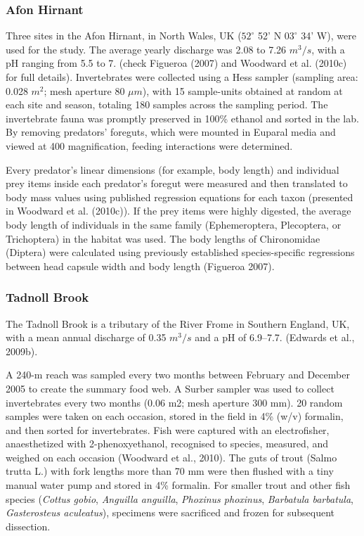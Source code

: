 \documentclass{article}
\begin{document}
\hypertarget{afon-hirnant}{%
\subsubsection{Afon Hirnant}\label{afon-hirnant}}

Three sites in the Afon Hirnant, in North Wales, UK (\(52^\circ\) 52' N
\(03^\circ\) 34' W), were used for the study. The average yearly
discharge was 2.08 to 7.26 \(m^3/s\), with a pH ranging from 5.5 to 7.
(check Figueroa (2007) and Woodward et al. (2010c) for full details).
Invertebrates were collected using a Hess sampler (sampling area: 0.028
\(m^2\); mesh aperture 80 \(\mu m\)), with 15 sample-units obtained at
random at each site and season, totaling 180 samples across the sampling
period. The invertebrate fauna was promptly preserved in 100\% ethanol
and sorted in the lab. By removing predators' foreguts, which were
mounted in Euparal media and viewed at 400 magnification, feeding
interactions were determined.

Every predator's linear dimensions (for example, body length) and
individual prey items inside each predator's foregut were measured and
then translated to body mass values using published regression equations
for each taxon (presented in Woodward et al. (2010c)). If the prey items
were highly digested, the average body length of individuals in the same
family (Ephemeroptera, Plecoptera, or Trichoptera) in the habitat was
used. The body lengths of Chironomidae (Diptera) were calculated using
previously established species-specific regressions between head capsule
width and body length (Figueroa 2007).

\hypertarget{tadnoll-brook}{%
\subsubsection{Tadnoll Brook}\label{tadnoll-brook}}

The Tadnoll Brook is a tributary of the River Frome in Southern England,
UK, with a mean annual discharge of 0.35 \(m^3/s\) and a pH of 6.9--7.7.
(Edwards et al., 2009b).

A 240-m reach was sampled every two months between February and December
2005 to create the summary food web. A Surber sampler was used to
collect invertebrates every two months (0.06 m2; mesh aperture 300 mm).
20 random samples were taken on each occasion, stored in the field in
4\% (w/v) formalin, and then sorted for invertebrates. Fish were
captured with an electrofisher, anaesthetized with 2-phenoxyethanol,
recognised to species, measured, and weighed on each occasion (Woodward
et al., 2010). The guts of trout (Salmo trutta L.) with fork lengths
more than 70 mm were then flushed with a tiny manual water pump and
stored in 4\% formalin. For smaller trout and other fish species
(\emph{Cottus gobio}, \emph{Anguilla anguilla}, \emph{Phoxinus
phoxinus}, \emph{Barbatula barbatula}, \emph{Gasterosteus aculeatus}),
specimens were sacrificed and frozen for subsequent dissection.
\end{document}
